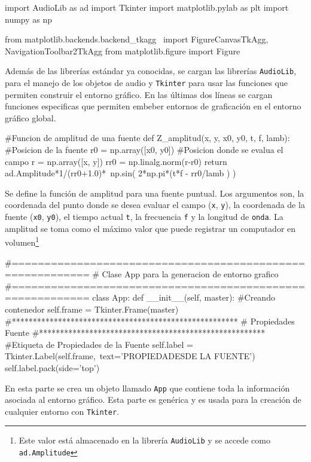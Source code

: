 \begin{listing}[style=python, numbers = none]
import AudioLib as ad
import Tkinter
import matplotlib.pylab as plt
import numpy as np

from matplotlib.backends.backend_tkagg \
import FigureCanvasTkAgg, NavigationToolbar2TkAgg
from matplotlib.figure import Figure
\end{listing}
Además de las librerías estándar ya conocidas, se cargan las librerías 
\texttt{AudioLib}, para el manejo de los objetos de audio y \texttt{Tkinter}
para usar las funciones que permiten construir el entorno gráfico. En las 
últimas dos líneas se cargan funciones especificas que permiten embeber
entornos de graficación en el entorno gráfico global.
 

\begin{listing}[style=python, numbers = none]
#Funcion de amplitud de una fuente
def Z_amplitud(x, y, x0, y0, t, f, lamb):
    #Posicion de la fuente
    r0 = np.array([x0, y0])
    #Posicion donde se evalua el campo
    r = np.array([x, y])
    rr0 = np.linalg.norm(r-r0)
    return ad.Amplitude*1/(rr0+1.0)*\
    np.sin( 2*np.pi*(t*f - rr0/lamb ) )
\end{listing}
Se define la función de amplitud para una fuente puntual. Los argumentos
son, la coordenada del punto donde se desea evaluar el campo (\texttt{x},
\texttt{y}), la coordenada de la fuente (\texttt{x0}, \texttt{y0}), el 
tiempo actual \texttt{t}, la frecuencia \texttt{f} y la longitud de 
\texttt{onda}. La amplitud se toma como el máximo valor que puede registrar
un computador en volumen\footnote{Este valor está almacenado en la librería
\texttt{AudioLib} y se accede como \texttt{ad.Amplitude}}


\begin{listing}[style=python, numbers = none]
#==========================================================
# Clase App para la generacion de entorno grafico
#==========================================================
class App:
  def __init__(self, master):
    #Creando contenedor
    self.frame = Tkinter.Frame(master)
    #******************************************************
    #	Propiedades Fuente
    #******************************************************
    #Etiqueta de Propiedades de la Fuente
    self.label = Tkinter.Label(self.frame,\
    text='PROPIEDADES\n DE LA FUENTE')
    self.label.pack(side='top')
\end{listing}
En esta parte se crea un objeto llamado \texttt{App} que contiene toda la 
información asociada al entorno gráfico. Esta parte es genérica y es 
usada para la creación de cualquier entorno con \texttt{Tkinter}.


